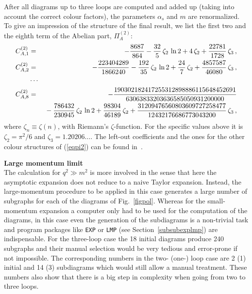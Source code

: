 After all diagrams up to three loops are computed and added up (taking
into account the correct colour factors), the parameters $\alpha_s$ and
$m$ are renormalized. To give an impression of the structure of
the final result, we list the first two and the eighth term of the
Abelian part, $\Pi_A^{(2)}$:
\begin{eqnarray}
   C^{(2)}_{A,1} &=&
          - {8687\over 864}
          - {32\over 5}\,\zeta_2\,\ln 2
          + 4\,\zeta_2
          + {22781\over 1728}\,\zeta_3\,,
\nonumber\\
   C^{(2)}_{A,2} &=&
          - {223404289\over 1866240}
          - {192\over 35}\,\zeta_2\,\ln 2
          + {24\over 7}\,\zeta_2
          + {4857587\over 46080}\,\zeta_3\,,
\label{eq::pfcn}
\\
&\cdots&
\nonumber\\
   C^{(2)}_{A,8} &=&
          - {190302182417255312898886115648452691\over 
             63063833203636585050931200000}
\nonumber\\
&&\mbox{}
          - {786432\over 230945}\,\zeta_2\,\ln 2
          + {98304\over 46189}\,\zeta_2
          + {31209476560803609727258477\over 12432176686773043200}\,\zeta_3
\nonumber
\,,
\end{eqnarray}
where $\zeta_n \equiv \zeta(n)$, with Riemann's $\zeta$-function. For
the specific values above it is $\zeta_2 = \pi^2/6$ and $\zeta_3 =
1.20206\ldots$.  The left-out coefficients and the ones for the other
colour structures of (\ref{eqpi2}) can be found in~\cite{CheKueSte96}.

%
\vspace{4ex}
{\bf Large momentum limit}\\[2ex]
%
The calculation for $q^2\gg m^2$ is more involved in the sense that
here the asymptotic expansion does not reduce to a naive Taylor
expansion.  Instead, the large-momentum procedure to be applied in this
case generates a large number of subgraphs for each of the diagrams of
Fig.~\ref{figpol}. Whereas for the small-momentum expansion a computer
only had to be used for the computation of the diagrams, in this
case even the generation of the subdiagrams is a non-trivial task and
program packages like {\tt EXP} or {\tt LMP} (see
Section~\ref{subsubexplmp}) are indispensable.
For the three-loop case the 18 initial diagrams produce 240 subgraphs
and their manual selection would be very tedious and error-prone if not
impossible.  The corresponding numbers in the two- (one-) loop case are
2 (1) initial and 14 (3) subdiagrams which would still allow a manual
treatment.  These numbers also show that there is a big step in
complexity when going from two to three loops.


